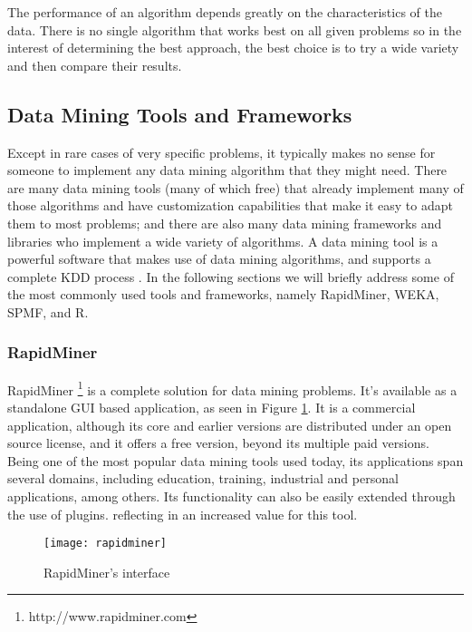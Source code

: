 The performance of an algorithm depends greatly on the characteristics of the data. There is no single algorithm that works best on all given problems \cite{wolpert1995no} so in the interest of determining the best approach, the best choice is to try a wide variety and then compare their results.

\subsection{Data Mining Tools and Frameworks}
Except in rare cases of very specific problems, it typically makes no sense for someone to implement any data mining algorithm that they might need. There are many data mining tools (many of which free) that already implement many of those algorithms and have customization capabilities that make it easy to adapt them to most problems; and there are also many data mining frameworks and libraries who implement a wide variety of algorithms. A data mining tool is a powerful software that makes use of data mining algorithms, and supports a complete KDD process \cite{mikut2011data}. In the following sections we will briefly address some of the most commonly used tools and frameworks, namely RapidMiner, WEKA, SPMF, and R. 

\subsubsection{RapidMiner}
RapidMiner \footnote{http://www.rapidminer.com} is a complete solution for data mining problems. It’s available as a standalone GUI based application, as seen in Figure \ref{fig:rapidminer}. It is a commercial application, although its core and earlier versions are distributed under an open source license, and it offers a free version, beyond its multiple paid versions. Being one of the most popular data mining tools used today, its applications span several domains, including education, training, industrial and personal applications, among others. Its functionality can also be easily extended through the use of plugins. reflecting in an increased value for this tool.

\begin{figure}[htb]
  \begin{center}
    \leavevmode
    \texttt{[image: rapidminer]}
	\caption{RapidMiner's interface}
    \label{fig:rapidminer}
  \end{center}
\end{figure}

